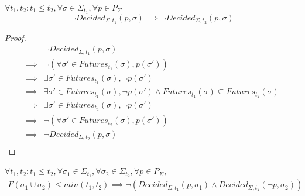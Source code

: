 \begin{lemma}
\label{lem:backw_safe}
$\forall t_1, t_2 : t_1 \leq t_2, \forall \sigma \in \Sigma_{t_1}, \forall p \in P_\Sigma$
$$
\neg Decided_{\Sigma, t_1}(p,\sigma) \implies \neg Decided_{\Sigma, t_2}(p,\sigma)
$$
\end{lemma}

\begin{proof}
\begin{align}
        &\neg Decided_{\Sigma, t_1}(p,\sigma) \\
\implies&\neg (\forall \sigma' \in Futures_{t_1}(\sigma), p(\sigma')) \\
\implies&\exists \sigma' \in Futures_{t_1}(\sigma), \neg p(\sigma') \\
\implies&\exists \sigma' \in Futures_{t_1}(\sigma), \neg p(\sigma') \land Futures_{t_1}(\sigma) \subseteq Futures_{t_2}(\sigma) \\
\implies&\exists \sigma' \in Futures_{t_2}(\sigma), \neg p(\sigma') \\
\implies&\neg (\forall \sigma' \in Futures_{t_2}(\sigma), p(\sigma')) \\
\implies&\neg Decided_{\Sigma, t_2}(p,\sigma) \\
\end{align}
\end{proof}



\begin{thm}
\label{thm:2party_consensus_safety}
$\forall t_1, t_2: t_1 \leq t_2, \forall \sigma_1 \in \Sigma_{t_1}, \forall \sigma_2 \in \Sigma_{t_2}, \forall p \in P_\Sigma$,
\begin{align}
F(\sigma_1 \cup \sigma_2) \leq min(t_1, t_2) \implies \neg (Decided_{\Sigma, t_1}(p,\sigma_1) \land Decided_{\Sigma, t_2}(\neg p, \sigma_2))
\end{align}
\end{thm}

